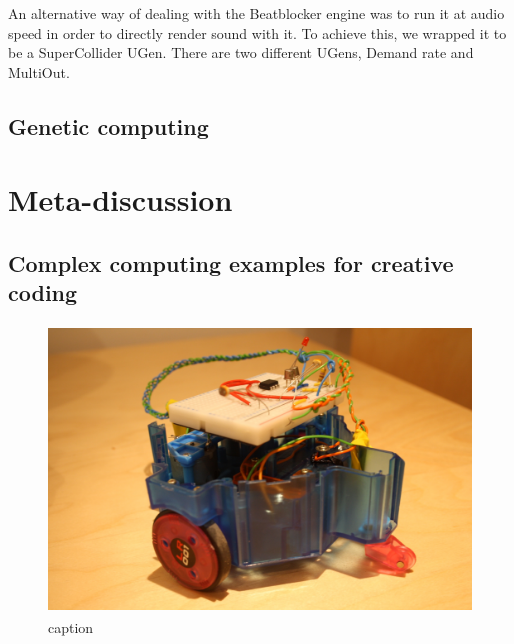 \documentclass[letterpaper, 12pt]{article}
\begin{document}
An alternative way of dealing with the Beatblocker engine was to run it at audio speed in order to directly render sound with it.
To achieve this, we wrapped it to be a SuperCollider UGen.
There are two different UGens, Demand rate and MultiOut.


\subsection{Genetic computing} %
\label{sec:genetic_computing}





\vspace*{24pt}

\section*{Meta-discussion} %
\label{sec:meta_discussion}

\subsection*{Complex computing examples for creative coding} %
\label{sub:creative_coding}

\begin{figure}
	\centering
		\includegraphics[height=3in]{../fig/bbbot.JPG}
	\caption{caption}
	\label{fig:fig_bbbot}
\end{figure}

\end{document}
